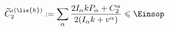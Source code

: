 \begin{equation}\label{schwainq}
    \widetilde{C}_2^{\iota(\lie{h})} := \sum_\alpha \frac{2 I_\alpha k P_\alpha + C_2^{\alpha}}{2(I_\alpha
      k+ v^\alpha)} \leqslant \Einsop
  \end{equation}

